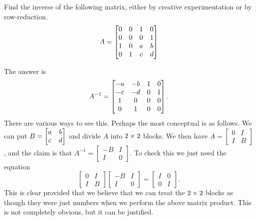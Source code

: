 \documentclass[a4paper]{amsart}
\renewenvironment{solution}{\SolutionInline}{\endSolutionInline}
\begin{document}
\begin{exercise}\label{ex-inverse-ii}
 Find the inverse of the following matrix, either by creative
 experimentation or by row-reduction.
 \[ A = \left[\begin{matrix} 0&0&1&0 \\ 0&0&0&1 \\ 1&0&a&b \\ 0&1&c&d \end{matrix}\right] \]
\end{exercise}
\begin{solution}
 The answer is
 \[ A^{-1} =
     \left[\begin{matrix} -a&-b&1&0 \\ -c&-d&0&1 \\ 1&0&0&0 \\ 0&1&0&0 \end{matrix}\right].
 \]
 There are various ways to see this.  Perhaps the most conceptual is
 as follows.  We can put $B=\left[\begin{matrix} a&b\\ c&d\end{matrix}\right]$ and divide $A$ into
 $2\times 2$ blocks.  We then have
 $A=\left[\begin{array}{c|c} 0&I\\ \hline I&B\end{array}\right]$, and
 the claim is that 
 $A^{-1}=\left[\begin{array}{c|c} -B&I\\ \hline I&0\end{array}\right]$.
 To check this we just need the equation
 \[ \left[\begin{array}{c|c}  0&I \\ \hline I&B\end{array}\right]
    \left[\begin{array}{c|c} -B&I \\ \hline I&0\end{array}\right] = 
    \left[\begin{array}{c|c}  I&0 \\ \hline 0&I\end{array}\right].
 \]
 This is clear provided that we believe that we can treat the $2\times 2$
 blocks as though they were just numbers when we perform the above
 matrix product.  This is not completely obvious, but it can be
 justified. 


\end{solution}
\end{document}
